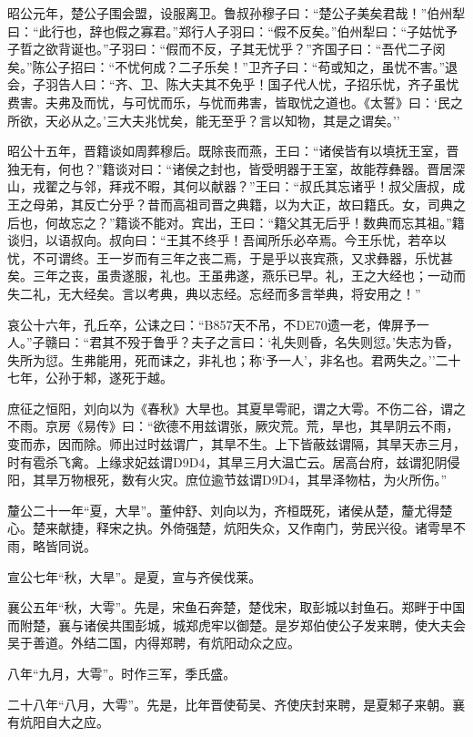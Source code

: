 \documentclass[]{article}
\begin{document}
昭公元年，楚公子围会盟，设服离卫。鲁叔孙穆子曰：``楚公子美矣君哉！''伯州犁曰：``此行也，辞也假之寡君。''郑行人子羽曰：``假不反矣。''伯州犁曰：``子姑忧予子晢之欲背诞也。''子羽曰：``假而不反，子其无忧乎？''齐国子曰：``吾代二子闵矣。''陈公子招曰：``不忧何成？二子乐矣！''卫齐子曰：``苟或知之，虽忧不害。''退会，子羽告人曰：``齐、卫、陈大夫其不免乎！国子代人忧，子招乐忧，齐子虽忧费害。夫弗及而忧，与可忧而乐，与忧而弗害，皆取忧之道也。《太誓》曰：`民之所欲，天必从之。'三大夫兆忧矣，能无至乎？言以知物，其是之谓矣。''

昭公十五年，晋籍谈如周葬穆后。既除丧而燕，王曰：``诸侯皆有以填抚王室，晋独无有，何也？''籍谈对曰：``诸侯之封也，皆受明器于王室，故能荐彝器。晋居深山，戎翟之与邻，拜戎不暇，其何以献器？''王曰：``叔氏其忘诸乎！叔父唐叔，成王之母弟，其反亡分乎？昔而高祖司晋之典籍，以为大正，故曰籍氏。女，司典之后也，何故忘之？''籍谈不能对。宾出，王曰：``籍父其无后乎！数典而忘其祖。''籍谈归，以语叔向。叔向曰：``王其不终乎！吾闻所乐必卒焉。今王乐忧，若卒以忧，不可谓终。王一岁而有三年之丧二焉，于是乎以丧宾燕，又求彝器，乐忧甚矣。三年之丧，虽贵遂服，礼也。王虽弗遂，燕乐已早。礼，王之大经也；一动而失二礼，无大经矣。言以考典，典以志经。忘经而多言举典，将安用之！''

哀公十六年，孔丘卒，公诔之曰：``B857天不吊，不DE70遗一老，俾屏予一人。''子赣曰：``君其不殁于鲁乎？夫子之言曰：`礼失则昏，名失则愆。'失志为昏，失所为愆。生弗能用，死而诔之，非礼也；称`予一人'，非名也。君两失之。''二十七年，公孙于邾，遂死于越。

庶征之恒阳，刘向以为《春秋》大旱也。其夏旱雩祀，谓之大雩。不伤二谷，谓之不雨。京房《易传》曰：``欲德不用兹谓张，厥灾荒。荒，旱也，其旱阴云不雨，变而赤，因而除。师出过时兹谓广，其旱不生。上下皆蔽兹谓隔，其旱天赤三月，时有雹杀飞禽。上缘求妃兹谓D9D4，其旱三月大温亡云。居高台府，兹谓犯阴侵阳，其旱万物根死，数有火灾。庶位逾节兹谓D9D4，其旱泽物枯，为火所伤。''

釐公二十一年``夏，大旱''。董仲舒、刘向以为，齐桓既死，诸侯从楚，釐尤得楚心。楚来献捷，释宋之执。外倚强楚，炕阳失众，又作南门，劳民兴役。诸雩旱不雨，略皆同说。

宣公七年``秋，大旱''。是夏，宣与齐侯伐莱。

襄公五年``秋，大雩''。先是，宋鱼石奔楚，楚伐宋，取彭城以封鱼石。郑畔于中国而附楚，襄与诸侯共围彭城，城郑虎牢以御楚。是岁郑伯使公子发来聘，使大夫会吴于善道。外结二国，内得郑聘，有炕阳动众之应。

八年``九月，大雩''。时作三军，季氏盛。

二十八年``八月，大雩''。先是，比年晋使荀吴、齐使庆封来聘，是夏邾子来朝。襄有炕阳自大之应。
\end{document}

